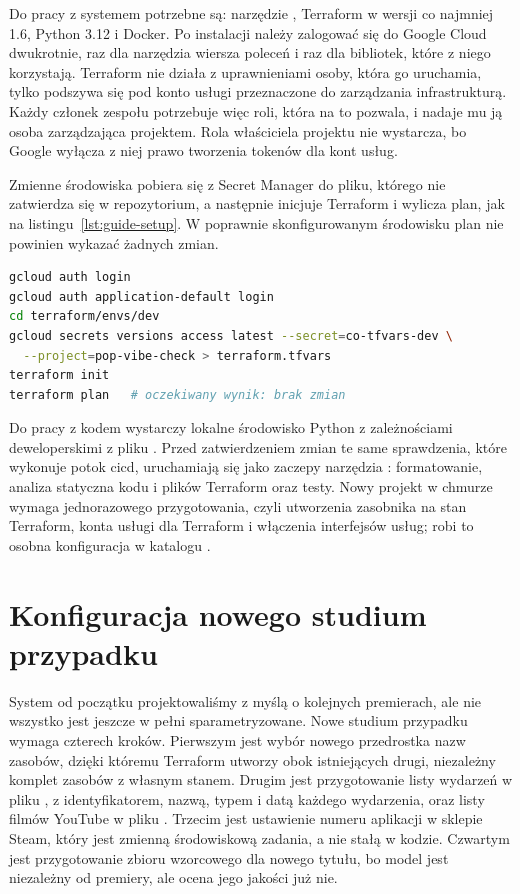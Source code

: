 Do pracy z systemem potrzebne są: narzędzie , Terraform w wersji co najmniej 1.6, Python 3.12 i Docker.
Po instalacji należy zalogować się do Google Cloud dwukrotnie, raz dla narzędzia wiersza poleceń i raz dla bibliotek, które z niego korzystają.
Terraform nie działa z uprawnieniami osoby, która go uruchamia, tylko podszywa się pod konto usługi przeznaczone do zarządzania infrastrukturą.
Każdy członek zespołu potrzebuje więc roli, która na to pozwala, i nadaje mu ją osoba zarządzająca projektem.
Rola właściciela projektu nie wystarcza, bo Google wyłącza z niej prawo tworzenia tokenów dla kont usług.

Zmienne środowiska pobiera się z Secret Manager do pliku, którego nie zatwierdza się w repozytorium, a następnie inicjuje Terraform i wylicza plan, jak na listingu~\ref{lst:guide-setup}.
W poprawnie skonfigurowanym środowisku plan nie powinien wykazać żadnych zmian.

\begin{lstlisting}[float=hbp, language=bash, caption={Przygotowanie lokalnej kopii konfiguracji i sprawdzenie planu zmian}, label={lst:guide-setup}]
gcloud auth login
gcloud auth application-default login
cd terraform/envs/dev
gcloud secrets versions access latest --secret=co-tfvars-dev \
  --project=pop-vibe-check > terraform.tfvars
terraform init
terraform plan   # oczekiwany wynik: brak zmian
\end{lstlisting}

Do pracy z kodem wystarczy lokalne środowisko Python z zależnościami deweloperskimi z pliku .
Przed zatwierdzeniem zmian te same sprawdzenia, które wykonuje potok \ac{cicd}, uruchamiają się jako zaczepy narzędzia : formatowanie, analiza statyczna kodu i plików Terraform oraz testy.
Nowy projekt w chmurze wymaga jednorazowego przygotowania, czyli utworzenia zasobnika na stan Terraform, konta usługi dla Terraform i włączenia interfejsów usług; robi to osobna konfiguracja w katalogu .

\section{Konfiguracja nowego studium przypadku}
\label{sec:guide-new-release}

System od początku projektowaliśmy z myślą o kolejnych premierach, ale nie wszystko jest jeszcze w pełni sparametryzowane.
Nowe studium przypadku wymaga czterech kroków.
Pierwszym jest wybór nowego przedrostka nazw zasobów, dzięki któremu Terraform utworzy obok istniejących drugi, niezależny komplet zasobów z własnym stanem.
Drugim jest przygotowanie listy wydarzeń w pliku \code{events.yaml}, z identyfikatorem, nazwą, typem i datą każdego wydarzenia, oraz listy filmów YouTube w pliku .
Trzecim jest ustawienie numeru aplikacji w sklepie Steam, który jest zmienną środowiskową zadania, a nie stałą w kodzie.
Czwartym jest przygotowanie zbioru wzorcowego dla nowego tytułu, bo model jest niezależny od premiery, ale ocena jego jakości już nie.

